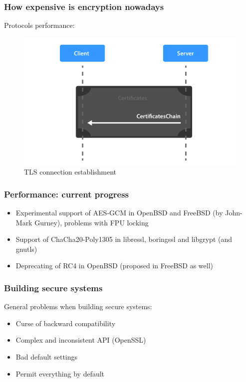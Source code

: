 \documentclass[11pt,t]{beamer}
\newcommand{\cipher}[1]{
	{\color{blue!30} #1}
}
\begin{document}
\begin{frame}[fragile]
\frametitle{How expensive is encryption nowadays}
Protocols performance:
\begin{figure}[H]
\centering
\includegraphics[height=0.6\textheight]{tls.pdf}
\caption{TLS connection establishment}
\end{figure}
\end{frame}

\begin{frame}
\frametitle{Performance: current progress}
\begin{itemize}
\item<1-> Experimental support of \cipher{AES-GCM} in OpenBSD and FreeBSD (by John-Mark 
Gurney), 
problems with FPU locking
\item<2-> Support of \cipher{ChaCha20-Poly1305} in libressl, boringssl and libgrypt (and 
gnutls)
\item<3-> Deprecating of \cipher{RC4} in OpenBSD (proposed in FreeBSD as well)
\end{itemize}
\end{frame}

\begin{frame}
\frametitle{Building secure systems}
General problems when building secure systems:
\begin{itemize}
\item<1-> Curse of backward compatibility
\item<2-> Complex and inconsistent API (OpenSSL)
\item<3-> Bad default settings
\item<3-> Permit everything by default
\end{itemize}
\end{frame}
\end{document}

